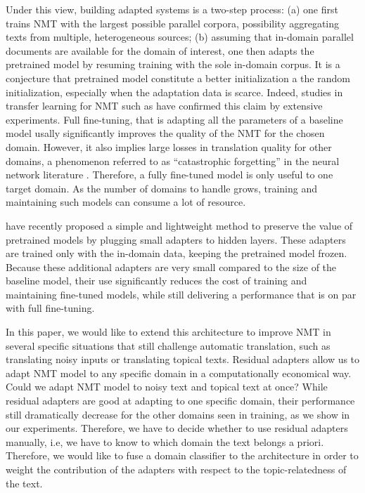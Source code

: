 \documentclass[11pt,a4paper]{article}
\newcommand{\fyTodo}[1]{\Todo[FY:]{\textcolor{orange}{#1}}}
\begin{document}
Under this view, building adapted systems is a two-step process: (a) one first trains NMT with the largest possible parallel corpora, possibility aggregating texts from multiple, heterogeneous sources; (b) assuming that in-domain parallel documents are available for the domain of interest, one then adapts the pretrained model by resuming training with the sole in-domain corpus. It is a conjecture that pretrained model constitute a better initialization a the random initialization, especially when the adaptation data is scarce. Indeed, studies in transfer learning for NMT such as \cite{artetxe20cross,aji20neural} have confirmed this claim by extensive experiments. Full fine-tuning, that is adapting all the parameters of a baseline model usally significantly improves the quality of the NMT for the chosen domain. However, it also implies large losses in translation quality for other domains, a phenomenon referred to as ``catastrophic forgetting'' in the neural network literature \cite{McCloskey89catastrophic}. Therefore, a fully fine-tuned model is only useful to one target domain. As the number of domains to handle grows, training and maintaining such models can consume a lot of resource.\fyTodo{Fix this sentence}

\cite{Vilar18learning,Bapna19simple} have recently proposed a simple and lightweight method to preserve the value of pretrained models by plugging small adapters to hidden layers. These adapters are trained only with the in-domain data, keeping the pretrained model frozen. Because these additional adapters are very small compared to the size of the baseline model, their use significantly reduces the cost of training and maintaining fine-tuned models, while still delivering a performance that is on par with full fine-tuning.

In this paper, we would like to extend this architecture to improve NMT in several specific situations that still challenge automatic translation, such as translating noisy inputs or translating topical texts\fyTodo{multidomain, multitopic, unbalance data}. Residual adapters allow us to adapt NMT model to any specific domain in a computationally economical way. Could we adapt NMT model to noisy text and topical text at once? While residual adapters are good at adapting to one specific domain, their performance still dramatically decrease for the other domains seen in training, as we show in our experiments. Therefore, we have to decide whether to use residual adapters manually, i.e, we have to know to which domain the text belongs a priori. Therefore, we would like to fuse a domain classifier to the architecture in order to weight the contribution of the adapters with respect to the topic-relatedness of the text.\fyTodo{Say differently: various implementations}
\end{document}
